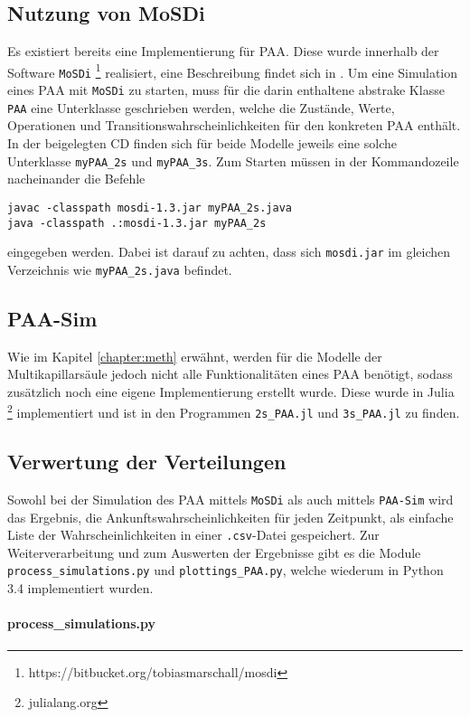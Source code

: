 \subsection{Nutzung von MoSDi}
Es existiert bereits eine Implementierung für PAA. Diese wurde innerhalb der Software \texttt{MoSDi} \footnote{https://bitbucket.org/tobiasmarschall/mosdi} realisiert, eine Beschreibung findet sich in \cite{Marschall2011}. Um eine Simulation eines PAA mit \texttt{MoSDi} zu starten, muss für die darin enthaltene abstrake Klasse \texttt{PAA} eine Unterklasse geschrieben werden, welche die Zustände, Werte, Operationen und Transitionswahrscheinlichkeiten für den konkreten PAA enthält. In der beigelegten CD finden sich für beide Modelle jeweils eine solche Unterklasse \texttt{myPAA\_2s} und \texttt{myPAA\_3s}. 
Zum Starten müssen in der Kommandozeile nacheinander die Befehle
\begin{verbatim}
javac -classpath mosdi-1.3.jar myPAA_2s.java
java -classpath .:mosdi-1.3.jar myPAA_2s 
\end{verbatim}
eingegeben werden. Dabei ist darauf zu achten, dass sich \texttt{mosdi.jar} im gleichen Verzeichnis wie \texttt{myPAA\_2s.java} befindet. 

\subsection{PAA-Sim}
Wie im Kapitel \ref{chapter:meth} erwähnt, werden für die Modelle der Multikapillarsäule jedoch nicht alle Funktionalitäten eines PAA benötigt, sodass zusätzlich noch eine eigene Implementierung erstellt wurde. Diese wurde in Julia \footnote{julialang.org} implementiert und ist in den Programmen \verb!2s_PAA.jl! und \verb!3s_PAA.jl! zu finden.


\subsection{Verwertung der Verteilungen}
Sowohl bei der Simulation des PAA mittels \texttt{MoSDi} als auch mittels \texttt{PAA-Sim} wird das Ergebnis, die Ankunftswahrscheinlichkeiten für jeden Zeitpunkt, als einfache Liste der Wahrscheinlichkeiten in einer \texttt{.csv}-Datei gespeichert. Zur Weiterverarbeitung und zum Auswerten der Ergebnisse gibt es die Module \verb!process_simulations.py! und \verb!plottings_PAA.py!, welche wiederum in Python 3.4 implementiert wurden.

\paragraph{process\_simulations.py}


